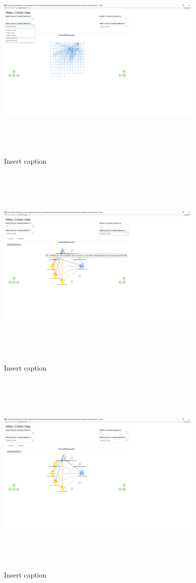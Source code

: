 \begin{figure}[h]
	\includegraphics[width=10cm,height=10cm]{eric/Viz Screenshot 2}
	\caption{Insert caption}
	\label{Insert label}
\end{figure}

\begin{figure}[h]
	\includegraphics[width=10cm,height=10cm]{eric/Viz Screenshot 3}
	\caption{Insert caption}
	\label{Insert label}
\end{figure}

\begin{figure}[h]
	\includegraphics[width=10cm,height=10cm]{eric/Viz Screenshot 4}
	\caption{Insert caption}
	\label{Insert label}
\end{figure}

